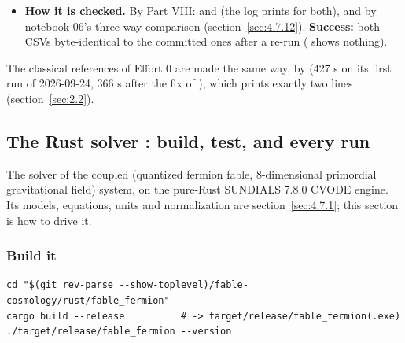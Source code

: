 \begin{itemize}
  \item \textbf{How it is checked.} By Part VIII:  and  (the log prints  for both), and by notebook 06's three-way comparison (section~\ref{sec:4.7.12}). \textbf{Success:} both CSVs byte-identical to the committed ones after a re-run ( shows nothing).
\end{itemize}

The classical references of Effort 0 are made the same way, by  (427 s on its first run of 2026-09-24, 366 s after the fix of ), which prints exactly two lines (section~\ref{sec:2.2}).

\subsection{The Rust solver \texorpdfstring{}{fable\_fermion}: build, test, and every run}
\label{sec:6.4}

The solver of the coupled (quantized fermion fable, 8-dimensional primordial gravitational field) system, on the pure-Rust SUNDIALS 7.8.0 CVODE engine. Its models, equations, units and normalization are section~\ref{sec:4.7.1}; this section is how to drive it.

\subsubsection{Build it}
\label{sec:6.4.1}

\begin{Verbatim}
cd "$(git rev-parse --show-toplevel)/fable-cosmology/rust/fable_fermion"
cargo build --release          # -> target/release/fable_fermion(.exe)
./target/release/fable_fermion --version
\end{Verbatim}

